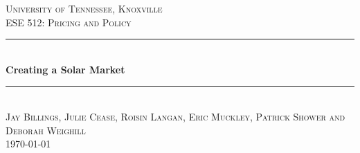\documentclass[10pt]{book} %
\begin{document}

\begin{titlepage}

\newcommand{\HRule}{\rule{\linewidth}{0.5mm}} %

\center %

\textsc{\LARGE University of Tennessee, Knoxville}\\[1.5cm] %
\textsc{\Large ESE 512: Pricing and Policy}\\[0.5cm] %

\HRule \\[0.4cm]
{ \huge \bfseries Creating a Solar Market}\\[0.4cm] %
\HRule \\[1.5cm]

\textsc{\large Jay Billings, Julie Cease, Roisin Langan, Eric Muckley, Patrick Shower and Deborah Weighill}\\[0.5cm] %





{\large \today}\\[3cm] %




\end{titlepage}




\end{document}
